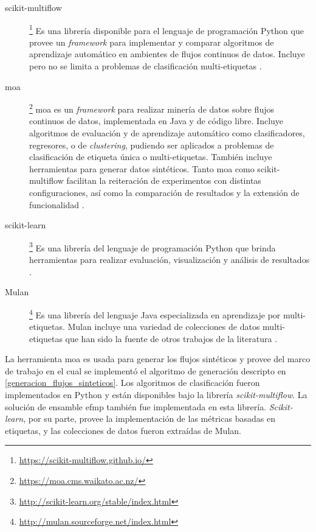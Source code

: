 \begin{description}

	\item[scikit-multiflow]\footnote{\url{https://scikit-multiflow.github.io/}} Es
	      una librería disponible para el lenguaje de programación Python que provee
	      un \textit{framework} para implementar y comparar algoritmos de aprendizaje
	      automático en ambientes de flujos continuos de datos. Incluye pero no se
	      limita a problemas de clasificación multi-etiquetas
	      \cite{montiel_scikit-multiflow_2018}.

	\item[\acrshort{moa}]\footnote{\url{https://moa.cms.waikato.ac.nz/}}
	      \acrfull{moa} es un \textit{framework} para realizar minería de datos sobre
	      flujos continuos de datos, implementada en Java y de código libre.  Incluye
	      algoritmos de evaluación y de aprendizaje automático como clasificadores,
	      regresores, o de \textit{clustering}, pudiendo ser aplicados a problemas de
	      clasificación de etiqueta única o multi-etiquetas.  También incluye
	      herramientas para generar datos sintéticos. Tanto \acrshort{moa} como
	      scikit-multiflow facilitan la reiteración de experimentos con distintas
	      configuraciones, así como la comparación de resultados y la extensión de
	      funcionalidad \cite{bifet_moa_2010}.

	\item[scikit-learn]\footnote{\url{http://scikit-learn.org/stable/index.html}}
	      Es una librería del lenguaje de programación Python que brinda
	      herramientas para realizar evaluación, visualización y análisis de
	      resultados \cite{pedregosa_scikit-learn_2018}.

	\item[Mulan]\footnote{\url{http://mulan.sourceforge.net/index.html}} Es una
	      librería del lenguaje Java especializada en aprendizaje por
	      multi-etiquetas. Mulan incluye una variedad de colecciones de datos
	      multi-etiquetas que han sido la fuente de otros trabajos de la literatura
	      \cite{tsoumakas_mulan_2011}.

\end{description} 

La herramienta \acrshort{moa} es usada para generar los flujos sintéticos y
provee del marco de trabajo en el cual se implementó el algoritmo de generación
descripto en \ref{generacion_flujos_sinteticos}. Los algoritmos de clasificación
fueron implementados en Python y están disponibles bajo la librería
\textit{scikit-multiflow}. La solución de ensamble \acrshort{efmp} también fue
implementada en esta librería. \textit{Scikit-learn}, por su parte, provee la
implementación de las métricas basadas en etiquetas, y las colecciones de datos
fueron extraídas de Mulan.

